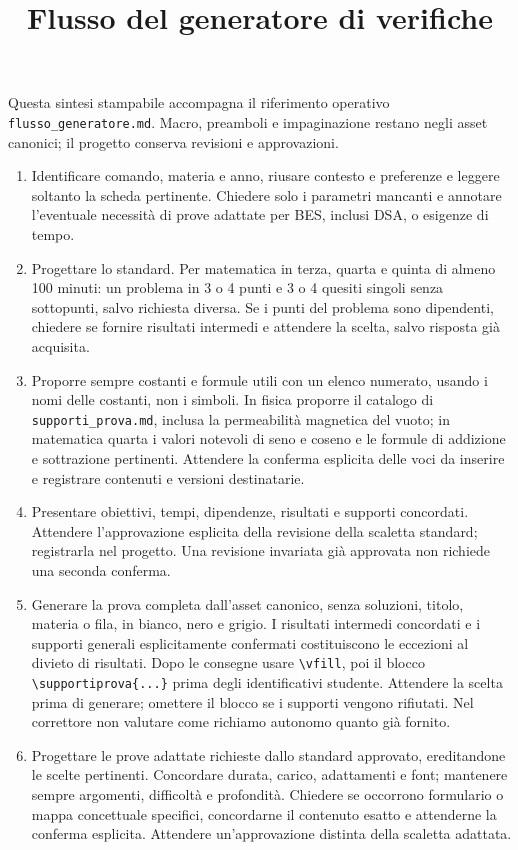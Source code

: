 \documentclass[a4paper,11pt]{article}
\title{Flusso del generatore di verifiche}
\author{}
\date{}
\begin{document}
\maketitle
Questa sintesi stampabile accompagna il riferimento operativo
\texttt{flusso\_generatore.md}. Macro, preamboli e impaginazione restano
negli asset canonici; il progetto conserva revisioni e approvazioni.
\begin{enumerate}
\item Identificare comando, materia e anno, riusare contesto e preferenze e leggere soltanto la scheda pertinente. Chiedere solo i parametri mancanti e annotare l’eventuale necessità di prove adattate per BES, inclusi DSA, o esigenze di tempo.
\item Progettare lo standard. Per matematica in terza, quarta e quinta di almeno 100 minuti: un problema in 3 o 4 punti e 3 o 4 quesiti singoli senza sottopunti, salvo richiesta diversa. Se i punti del problema sono dipendenti, chiedere se fornire risultati intermedi e attendere la scelta, salvo risposta già acquisita.
\item Proporre sempre costanti e formule utili con un elenco numerato, usando i nomi delle costanti, non i simboli. In fisica proporre il catalogo di \texttt{supporti\_prova.md}, inclusa la permeabilità magnetica del vuoto; in matematica quarta i valori notevoli di seno e coseno e le formule di addizione e sottrazione pertinenti. Attendere la conferma esplicita delle voci da inserire e registrare contenuti e versioni destinatarie.
\item Presentare obiettivi, tempi, dipendenze, risultati e supporti concordati. Attendere l'approvazione esplicita della revisione della scaletta standard; registrarla nel progetto. Una revisione invariata già approvata non richiede una seconda conferma.
\item Generare la prova completa dall'asset canonico, senza soluzioni, titolo, materia o fila, in bianco, nero e grigio. I risultati intermedi concordati e i supporti generali esplicitamente confermati costituiscono le eccezioni al divieto di risultati. Dopo le consegne usare \verb|\vfill|, poi il blocco \verb|\supportiprova{...}| prima degli identificativi studente. Attendere la scelta prima di generare; omettere il blocco se i supporti vengono rifiutati. Nel correttore non valutare come richiamo autonomo quanto già fornito.
\item Progettare le prove adattate richieste dallo standard approvato, ereditandone le scelte pertinenti. Concordare durata, carico, adattamenti e font; mantenere sempre argomenti, difficoltà e profondità. Chiedere se occorrono formulario o mappa concettuale specifici, concordarne il contenuto esatto e attenderne la conferma esplicita. Attendere un’approvazione distinta della scaletta adattata.

\end{enumerate}
\end{document}
